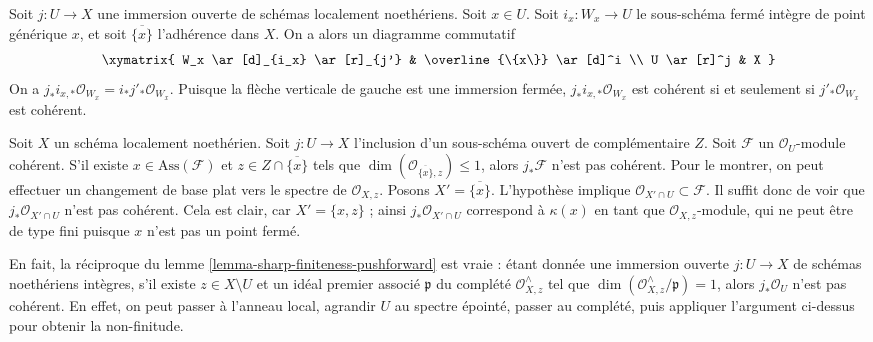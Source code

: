 \begin{remark}
\label{remark-closure}
Soit $j : U \to X$ une immersion ouverte de schémas localement noethériens. Soit $x \in U$. Soit $i_x : W_x \to U$ le sous-schéma fermé intègre de point générique $x$, et soit $\overline{\{x\}}$ l'adhérence dans $X$. On a alors un diagramme commutatif
$$
\xymatrix{
W_x \ar[d]_{i_x} \ar[r]_{j'} & \overline{\{x\}} \ar[d]^i \\
U \ar[r]^j & X
}
$$
On a $j_*i_{x, *}\mathcal{O}_{W_x} = i_*j'_*\mathcal{O}_{W_x}$. Puisque la flèche verticale de gauche est une immersion fermée, $j_*i_{x, *}\mathcal{O}_{W_x}$ est cohérent si et seulement si $j'_*\mathcal{O}_{W_x}$ est cohérent.
\end{remark}

\begin{remark}
\label{remark-no-finiteness-pushforward}
Soit $X$ un schéma localement noethérien. Soit $j : U \to X$ l'inclusion d'un sous-schéma ouvert de complémentaire $Z$. Soit $\mathcal{F}$ un $\mathcal{O}_U$-module cohérent. S'il existe $x \in \text{Ass}(\mathcal{F})$ et $z \in Z \cap \overline{\{x\}}$ tels que $\dim(\mathcal{O}_{\overline{\{x\}}, z}) \leq 1$, alors $j_*\mathcal{F}$ n'est pas cohérent. Pour le montrer, on peut effectuer un changement de base plat vers le spectre de $\mathcal{O}_{X, z}$. Posons $X' = \overline{\{x\}}$. L'hypothèse implique $\mathcal{O}_{X' \cap U} \subset \mathcal{F}$. Il suffit donc de voir que $j_*\mathcal{O}_{X' \cap U}$ n'est pas cohérent. Cela est clair, car $X' = \{x, z\}$ ; ainsi $j_*\mathcal{O}_{X' \cap U}$ correspond à $\kappa(x)$ en tant que $\mathcal{O}_{X, z}$-module, qui ne peut être de type fini puisque $x$ n'est pas un point fermé.

\medskip\noindent
En fait, la réciproque du lemme \ref{lemma-sharp-finiteness-pushforward} est vraie : étant donnée une immersion ouverte $j : U \to X$ de schémas noethériens intègres, s'il existe $z \in X \setminus U$ et un idéal premier associé $\mathfrak p$ du complété $\mathcal{O}_{X, z}^\wedge$ tel que $\dim(\mathcal{O}_{X, z}^\wedge/\mathfrak p) = 1$, alors $j_*\mathcal{O}_U$ n'est pas cohérent. En effet, on peut passer à l'anneau local, agrandir $U$ au spectre épointé, passer au complété, puis appliquer l'argument ci-dessus pour obtenir la non-finitude.
\end{remark}


